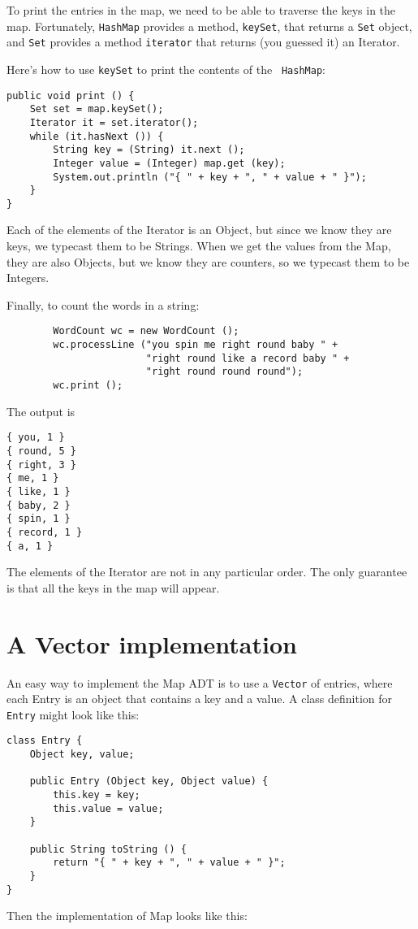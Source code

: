 To print the entries in the map, we need to be able to traverse the
keys in the map.  Fortunately, {\tt HashMap}
provides a method, {\tt keySet}, that returns a {\tt Set}
object, and {\tt Set} provides a method {\tt iterator} that returns
(you guessed it) an Iterator.

Here's how to use {\tt keySet} to print the contents of the {\tt
HashMap}:

\begin{verbatim}
public void print () {
    Set set = map.keySet();
    Iterator it = set.iterator();
    while (it.hasNext ()) {
        String key = (String) it.next ();
        Integer value = (Integer) map.get (key);
        System.out.println ("{ " + key + ", " + value + " }"); 
    }
}    
\end{verbatim}
%
Each of the elements of the Iterator is an Object,
but since we know they are keys, we typecast them to be Strings.
When we get the values from the Map, they are also Objects,
but we know they are counters, so we typecast them to be Integers.

Finally, to count the words in a string:

\begin{verbatim}
        WordCount wc = new WordCount ();
        wc.processLine ("you spin me right round baby " +
                        "right round like a record baby " +
                        "right round round round");
        wc.print ();
\end{verbatim}
%
The output is

\begin{verbatim}
{ you, 1 }
{ round, 5 }
{ right, 3 }
{ me, 1 }
{ like, 1 }
{ baby, 2 }
{ spin, 1 }
{ record, 1 }
{ a, 1 }
\end{verbatim}
%
The elements of the Iterator are not in any particular order.
The only guarantee is that all the keys in the map will appear.


\section {A Vector implementation}

An easy way to implement the Map ADT is to use a {\tt Vector}
of entries, where each Entry is an object that contains a key
and a value.
A class definition for {\tt Entry} might look like
this:

\begin{verbatim}
class Entry {
    Object key, value;

    public Entry (Object key, Object value) {
        this.key = key;
        this.value = value;
    }

    public String toString () {
        return "{ " + key + ", " + value + " }";
    }
}
\end{verbatim}
%
Then the implementation of Map looks like this:

